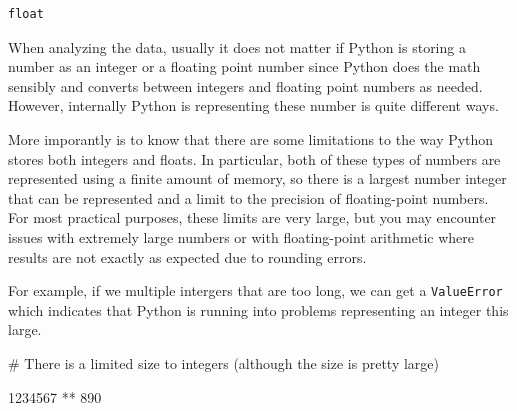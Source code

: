 \documentclass[
  letterpaper,
  DIV=11,
  numbers=noendperiod]{scrreprt}
\newenvironment{Shaded}{\begin{snugshade}}{\end{snugshade}}
\newcommand{\CommentTok}[1]{\textcolor[rgb]{0.37,0.37,0.37}{#1}}
\newcommand{\DecValTok}[1]{\textcolor[rgb]{0.68,0.00,0.00}{#1}}
\newcommand{\OperatorTok}[1]{\textcolor[rgb]{0.37,0.37,0.37}{#1}}
\begin{document}
\begin{verbatim}
float
\end{verbatim}

When analyzing the data, usually it does not matter if Python is storing
a number as an integer or a floating point number since Python does the
math sensibly and converts between integers and floating point numbers
as needed. However, internally Python is representing these number is
quite different ways.

More imporantly is to know that there are some limitations to the way
Python stores both integers and floats. In particular, both of these
types of numbers are represented using a finite amount of memory, so
there is a largest number integer that can be represented and a limit to
the precision of floating-point numbers. For most practical purposes,
these limits are very large, but you may encounter issues with extremely
large numbers or with floating-point arithmetic where results are not
exactly as expected due to rounding errors.

For example, if we multiple intergers that are too long, we can get a
\texttt{ValueError} which indicates that Python is running into problems
representing an integer this large.

\begin{Shaded}
\begin{Highlighting}[]
\CommentTok{\# There is a limited size to integers (although the size is pretty large)}

\DecValTok{1234567} \OperatorTok{**} \DecValTok{890} 
\end{Highlighting}
\end{Shaded}
\end{document}

